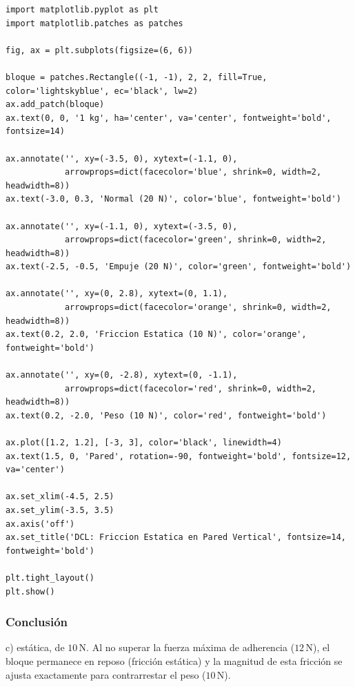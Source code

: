 \documentclass[12pt]{article}
\begin{document}
\begin{lstlisting}
import matplotlib.pyplot as plt
import matplotlib.patches as patches

fig, ax = plt.subplots(figsize=(6, 6))

bloque = patches.Rectangle((-1, -1), 2, 2, fill=True, color='lightskyblue', ec='black', lw=2)
ax.add_patch(bloque)
ax.text(0, 0, '1 kg', ha='center', va='center', fontweight='bold', fontsize=14)

ax.annotate('', xy=(-3.5, 0), xytext=(-1.1, 0), 
            arrowprops=dict(facecolor='blue', shrink=0, width=2, headwidth=8))
ax.text(-3.0, 0.3, 'Normal (20 N)', color='blue', fontweight='bold')

ax.annotate('', xy=(-1.1, 0), xytext=(-3.5, 0), 
            arrowprops=dict(facecolor='green', shrink=0, width=2, headwidth=8))
ax.text(-2.5, -0.5, 'Empuje (20 N)', color='green', fontweight='bold')

ax.annotate('', xy=(0, 2.8), xytext=(0, 1.1), 
            arrowprops=dict(facecolor='orange', shrink=0, width=2, headwidth=8))
ax.text(0.2, 2.0, 'Friccion Estatica (10 N)', color='orange', fontweight='bold')

ax.annotate('', xy=(0, -2.8), xytext=(0, -1.1), 
            arrowprops=dict(facecolor='red', shrink=0, width=2, headwidth=8))
ax.text(0.2, -2.0, 'Peso (10 N)', color='red', fontweight='bold')

ax.plot([1.2, 1.2], [-3, 3], color='black', linewidth=4)
ax.text(1.5, 0, 'Pared', rotation=-90, fontweight='bold', fontsize=12, va='center')

ax.set_xlim(-4.5, 2.5)
ax.set_ylim(-3.5, 3.5)
ax.axis('off')
ax.set_title('DCL: Friccion Estatica en Pared Vertical', fontsize=14, fontweight='bold')

plt.tight_layout()
plt.show()
\end{lstlisting}

\subsubsection*{Conclusión}
c) estática, de $10 \, \text{N}$. Al no superar la fuerza máxima de adherencia ($12 \, \text{N}$), el bloque permanece en reposo (fricción estática) y la magnitud de esta fricción se ajusta exactamente para contrarrestar el peso ($10 \, \text{N}$).

\newpage
\end{document}
